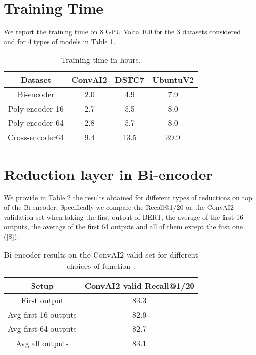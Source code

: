 \documentclass{article} \usepackage{iclr2020_conference,times}
\begin{document}


\newpage
\appendix
\section{Training Time}

We report the training time on 8 GPU Volta 100 for the 3 datasets considered and for 4 types of models in Table \ref{table:training_times}.


\begin{table}[h]
\center
\begin{small}
\begin{tabular}{|c|c|c|c|}
\hline
Dataset & ConvAI2 & DSTC7 & UbuntuV2\\
\hline
Bi-encoder & 2.0 & 4.9 & 7.9 \\
\hline
Poly-encoder 16 & 2.7 & 5.5 & 8.0 \\
\hline
Poly-encoder 64 & 2.8 & 5.7 & 8.0 \\
\hline
Cross-encoder64 & 9.4 & 13.5 & 39.9 \\
\hline

\end{tabular}
\end{small}
\caption{Training time in hours.}
\label{table:training_times}
\end{table}


\section{Reduction layer in Bi-encoder}

We provide in Table \ref{table:reduction} the results obtained for different types of reductions on top of the Bi-encoder. Specifically we compare the Recall@1/20 on the ConvAI2 validation set when taking the first output of BERT, the average of the first 16 outputs, the average of the first 64 outputs and all of them except the first one ([S]).

\begin{table}[h]
\center
\begin{small}
\begin{tabular}{|c|c|}
\hline
Setup & ConvAI2 valid Recall@1/20\\
\hline
First output & 83.3 \\
\hline
Avg first 16 outputs & 82.9 \\
\hline
Avg first 64 outputs & 82.7 \\
\hline
Avg all outputs & 83.1\\
\hline

\end{tabular}
\end{small}
\caption{Bi-encoder results on the ConvAI2 valid set for different choices of function .}
\label{table:reduction}
\end{table}
\end{document}

